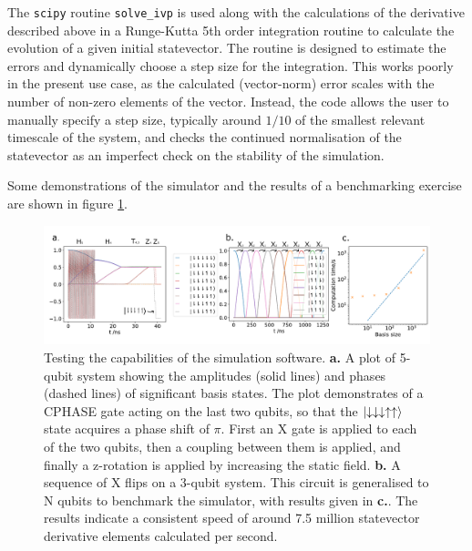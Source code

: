 \documentclass{report}
\begin{document}
The \texttt{scipy} routine \texttt{solve\_ivp} is used along with the calculations of the derivative described above in a Runge-Kutta 5th order \cite{Butcher1996} integration routine to calculate the evolution of a given initial statevector. The routine is designed to estimate the errors and dynamically choose a step size for the integration. This works poorly in the present use case, as the calculated (vector-norm) error scales with the number of non-zero elements of the vector. Instead, the code allows the user to manually specify a step size, typically around $1/10$ of the smallest relevant timescale of the system, and checks the continued normalisation of the statevector as an imperfect check on the stability of the simulation.

Some demonstrations of the simulator and the results of a benchmarking exercise are shown in figure \ref{fig:benchmark}. 
\begin{figure}[ht]
    \centering
    \includegraphics[scale = 0.85]{Figures/benchmark/benchmarks.pdf}
    \caption{Testing the capabilities of the simulation software. \textbf{a.} A plot of 5-qubit system showing the amplitudes (solid lines) and phases (dashed lines) of significant basis states. The plot demonstrates of a CPHASE gate acting on the last two qubits, so that the $\ket{\downarrow\downarrow\downarrow\uparrow\uparrow}$ state acquires a phase shift of $\pi$. First an X gate is applied to each of the two qubits, then a coupling between them is applied, and finally a z-rotation is applied by increasing the static field\protect\footnotemark. \textbf{b.} A sequence of X flips on a 3-qubit system. This circuit is generalised to N qubits to benchmark the simulator, with results given in \textbf{c.}. The results indicate a consistent speed of around 7.5 million statevector derivative elements calculated per second.}
    \label{fig:benchmark}
\end{figure}
\end{document}
